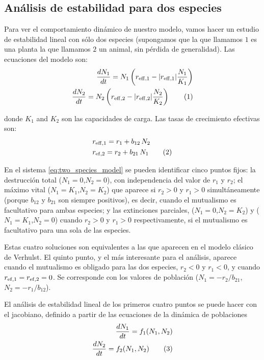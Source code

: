 \subsection{Análisis de estabilidad para dos especies}

Para ver el comportamiento dinámico de nuestro modelo, vamos hacer un estudio de estabilidad lineal con sólo dos especies (supongamos que la que llamamos $1$ es una planta la que llamamos $2$ un animal, sin pérdida de generalidad). Las ecuaciones del modelo son:
\begin{align*}
\displaystyle \frac{dN_1}{dt}= N_1 \left( r_{\rm{eff},1} - |r_{\rm{eff},1}| \frac{N_1}{K_1} \right) \\
\displaystyle \frac{dN_2}{dt}= N_2 \left( r_{\rm{eff},2} - |r_{\rm{eff},2}| \frac{N_2}{K_2} \right)
\stepcounter{equation}\tag{\theequation}\label{eq:two_species_model}
\end{align*}

\noindent donde $K_1$ and $K_2$ son las capacidades de carga. Las tasas de crecimiento efectivas son:
\begin{align*}
\displaystyle &r_{\rm{eff},1} = r_{1} + b_{12}\, N_2 \\
\displaystyle &r_{\rm{ef},2} = r_{2} + b_{21}\, N_1
\stepcounter{equation}\tag{\theequation}\label{eq:two_species_reff}
\end{align*}

En el sistema \ref{eq:two_species_model} se pueden identificar cinco puntos fijos:
la destrucción total ($N_1=0$,$N_2=0$), con independencia del valor de $r_{1}$ y $r_{2}$;
el máximo vital ($N_1=K_1$,$N_2=K_2$) que aparece si $r_{2}>0$ y $r_{1}>0$ simultáneamente (porque $b_{12}$ y $b_{21}$ son siempre positivos), es decir, cuando el mutualismo es facultativo para ambas especies; y las extinciones parciales, ($N_1=0$,$N_2=K_2$)
y ($N_1=K_1$,$N_2=0$) cuando $r_{2}>0$ y $r_{1}>0$ respectivamente, si el mutualismo es facultativo para una sola de las especies. 

Estas cuatro soluciones son equivalentes a las que aparecen en el modelo clásico de Verhulst. El quinto punto, y el más interesante para el análisis, aparece cuando el mutualismo es obligado para las dos especies, $r_{2}<0$ y $r_{1}<0$, y cuando $r_{\rm{ef},1}=r_{\rm{ef},2}=0$. Se corresponde con los valores de población ($N_1={-r_{2}}/{b_{21}}$, $N_2={-r_{1}}/{b_{12}}$).

El análisis de estabilidad lineal de los primeros cuatro puntos se puede hacer con el jacobiano, definido a partir de las ecuaciones de la dinámica de poblaciones
\begin{align*}
 \frac{dN_1}{dt} = f_1(N_1,N_2) \\
 \frac{dN_2}{dt} = f_2(N_1,N_2)
\stepcounter{equation}\tag{\theequation}\label{eq:Jacob00}
\end{align*}

